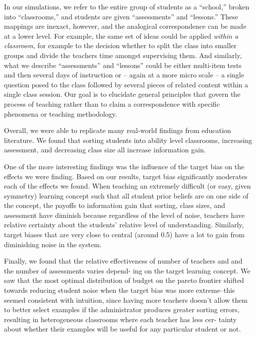 \documentclass[10pt, letterpaper]{article}
\begin{document}
In our simulations, we refer to the entire group of students as a
``school,'' broken into ``classrooms,'' and students are given
``assessments'' and ``lessons.'' These mappings are inexact, however,
and the analogical correspondence can be made at a lower level. For
example, the same set of ideas could be applied \emph{within a
classroom}, for example to the decision whether to split the class into
smaller groups and divide the teachers time amongst supervising them.
And similarly, what we describe ``assessments'' and ``lessons'' could be
either multi-item tests and then several days of instruction or -- again
at a more micro scale -- a single question posed to the class followed
by several pieces of related content within a single class session. Our
goal is to elucidate general principles that govern the process of
teaching rather than to claim a correspondence with specific phenomena
or teaching methodology.

Overall, we were able to replicate many real-world findings from
education literature. We found that sorting students into ability level
classrooms, increasing assessment, and decreasing class size all
increase information gain.

One of the more interesting findings was the influence of the target
bias on the effects we were finding. Based on our results, target bias
significantly moderates each of the effects we found. When teaching an
extremely difficult (or easy, given symmetry) learning concept such that
all student prior beliefs are on one side of the concept, the payoffs to
information gain that sorting, class sizes, and assessment have diminish
because regardless of the level of noise, teachers have relative
certainty about the students' relative level of understanding.
Similarly, target biases that are very close to central (around 0.5)
have a lot to gain from diminishing noise in the system.

Finally, we found that the relative effectiveness of number of teachers
and and the number of assessments varies depend- ing on the target
learning concept. We saw that the most optimal distribution of budget on
the pareto frontier shifted towards reducing student noise when the
target bias was more extreme--this seemed consistent with intuition,
since having more teachers doesn't allow them to better select examples
if the administrator produces greater sorting errors, resulting in
heterogeneous classrooms where each teacher has less cer- tainty about
whether their examples will be useful for any particular student or not.
\end{document}
